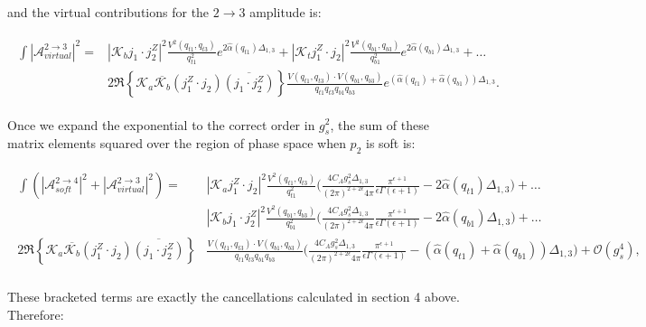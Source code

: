 		and the virtual contributions for the $2\rightarrow3$ amplitude is:

		\begin{align}
		\begin{split}
			\int|\mathcal{A}^{2\rightarrow3}_{virtual}|^2 = &|\mathcal{K}_bj_1\cdot j_2^Z|^2
			\frac{V^2(q_{t1}, q_{t3})}{q_{t1}^2}e^{2\hat{\alpha}(q_{t1})\Delta_{1,3}} +
			|\mathcal{K}_tj_1^Z\cdot j_2|^2 \frac{V^2(q_{b1}, q_{b3})}{q_{b1}^2}e^{2\hat{\alpha}(q_{b1})\Delta_{1,3}} + \ldots \\
			& 2\Re\left\{\mathcal{K}_a\overline{\mathcal{K}_b}  (j_1^Z\cdot j_2)\overline{(j_1\cdot j_2^Z)}\right\}
			\frac{V(q_{t1}, q_{t3})\cdot V(q_{b1}, q_{b3})}{q_{t1}q_{t3}q_{b1}q_{b3}}e^{(\hat{\alpha}(q_{t1}) +
			\hat{\alpha}(q_{b1}))\Delta_{1,3}}.
		\end{split}
		\end{align}

		Once we expand the exponential to the correct order in $g_s^2$, the sum of these
		matrix elements squared over the region of phase space when $p_2$ is soft is:

		\begin{align}
		\begin{split}
			\int\left(|\mathcal{A}^{2\rightarrow4}_{soft}|^2 + |\mathcal{A}^{2\rightarrow3}_{virtual}|^2\right) =
			&|\mathcal{K}_aj_1^Z\cdot j_2|^2 \frac{V^2(q_{t1}, q_{t3})}{q_{t1}^2}
			{\Bigg(\frac{4C_Ag_s^2\Delta_{1,3}}{(2\pi)^{2+2\epsilon}4\pi}\frac{\pi^{\epsilon+1}}
			{\epsilon\Gamma(\epsilon+1)} - 2\hat{\alpha}(q_{t1})\Delta_{1,3}\Bigg)}+\ldots \\
			& |\mathcal{K}_bj_1\cdot j_2^Z|^2 \frac{V^2(q_{b1}, q_{b3})}{q_{b1}^2}
			{\Bigg(\frac{4C_Ag_s^2\Delta_{1,3}}{(2\pi)^{2+2\epsilon}4\pi}\frac{\pi^{\epsilon+1}}
			{\epsilon\Gamma(\epsilon+1)} - 2\hat{\alpha}(q_{b1})\Delta_{1,3}\Bigg)}+\ldots \\
			2\Re\left\{\mathcal{K}_a\overline{\mathcal{K}_b}  (j_1^Z\cdot j_2)\overline{(j_1\cdot j_2^Z)}\right\}&
			\frac{V(q_{t1}, q_{t3})\cdot V(q_{b1}, q_{b3})}{q_{t1}q_{t3}q_{b1}q_{b3}}{\Bigg(\frac{4C_Ag_s^2\Delta_{1,3}}
			{(2\pi)^{2+2\epsilon}4\pi}\frac{\pi^{\epsilon+1}}{\epsilon\Gamma(\epsilon+1)} -
			(\hat{\alpha}(q_{t1}) + \hat{\alpha}(q_{b1}))\Delta_{1,3}\Bigg)} + \mathcal{O}(g_s^4),\\
		\end{split}
		\end{align}

		These bracketed terms are exactly the cancellations calculated in section 4 above.  Therefore:

